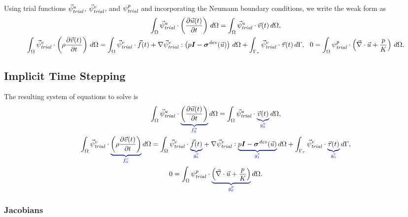 Using trial functions $\trialvec[u]$, $\trialvec[v]$, and $\trialscalar[p]$ and
incorporating the Neumann boundary conditions, we write the weak form
as
\begin{gather}
  \int_\Omega \trialvec[u] \cdot \left( \frac{\partial \vec{u}(t)}{\partial t} \right) \, 
d\Omega = 
  \int_\Omega \trialvec[u] \cdot \vec{v}(t) \, d\Omega, \\
  \int_\Omega \trialvec[v] \cdot \left( \rho \frac{\partial \vec{v}(t)}{\partial t} \right) \, 
d\Omega = 
  \int_\Omega \trialvec[v] \cdot \vec{f}(t) + \nabla \trialvec[v] : \left(p\tensor{I}-
\tensor{\sigma}^\mathit{dev}
(\vec{u})\right)\, d\Omega + \int_{\Gamma_\tau} \trialvec[v] \cdot \vec{\tau}(t) \, d\Gamma, \
\
  0 = \int_\Omega \trialscalar[p] \cdot \left(\vec{\nabla} \cdot \vec{u} + \frac{p}{K} \right) 
\, d\Omega.
\end{gather}

\subsection{Implicit Time Stepping}
The resulting system of equations to solve  is
\begin{gather}
  \label{eqn:imcompressible:elasticity:velocity}
  \int_\Omega \trialvec[u] \cdot \eqnannotate{\left( \frac{\partial \vec{u}(t)}{\partial t} 
\right)}{f_0^u} \, 
d\Omega = 
  \int_\Omega \trialvec[u] \cdot \eqnannotate{\vec{v}(t)}{g_0^u} \, d\Omega, \\
%
  \label{eqn:incompressible:elasticity:displacement:implicit}
  \int_\Omega \trialvec[v] \cdot \eqnannotate{\left( \rho \frac{\partial \vec{v}(t)}{\partial 
t} \right)}{f_0^v} 
\, d\Omega =
  \int_\Omega \trialvec[v] \cdot \eqnannotate{\vec{f}(t)}{g_0^v} + \nabla \trialvec[v] : 
\eqnannotate{p\tensor{I}-
\tensor{\sigma}^\mathit{dev}(\vec{u})}{g_1^v} \, d\Omega + \int_{\Gamma_\tau} \trialvec[v] 
\cdot 
\eqnannotate{\vec{\tau}(t)}{g_0^v} \, d\Gamma, \\
%
  \label{eqn:incompressible:elasticity:pressure:implicit}
  0 = \int_\Omega \trialscalar[p] \cdot \eqnannotate{\left(\vec{\nabla} \cdot \vec{u} + 
\frac{p}{K} \right)}
{g_0^p} \, d\Omega.
\end{gather}


\subsubsection{Jacobians}

